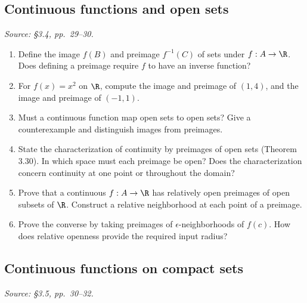 \subsection{Continuous functions and open sets}
\textit{Source: \S3.4, pp.~29--30.}

\begin{enumerate}[resume]
  \item Define the image \(f(B)\) and preimage \(f^{-1}(C)\) of sets
    under \(f:A\to\R\). Does defining a preimage require \(f\)
    to have an inverse function?

  \item For \(f(x)=x^2\) on \(\R\), compute the image and preimage
    of \((1,4)\), and the image and preimage of \((-1,1)\).

  \item Must a continuous function map open sets to open sets?
    Give a counterexample and distinguish images from preimages.

  \item State the characterization of continuity by preimages of open
    sets (Theorem 3.30). In which space must each preimage be open?
    Does the characterization concern continuity at one point or
    throughout the domain?

  \item Prove that a continuous \(f:A\to\R\) has relatively open
    preimages of open subsets of \(\R\). Construct a relative
    neighborhood at each point of a preimage.

  \item Prove the converse by taking preimages of
    \(\epsilon\)-neighborhoods of \(f(c)\).
    How does relative openness provide the required input radius?
\end{enumerate}

\subsection{Continuous functions on compact sets}
\textit{Source: \S3.5, pp.~30--32.}

